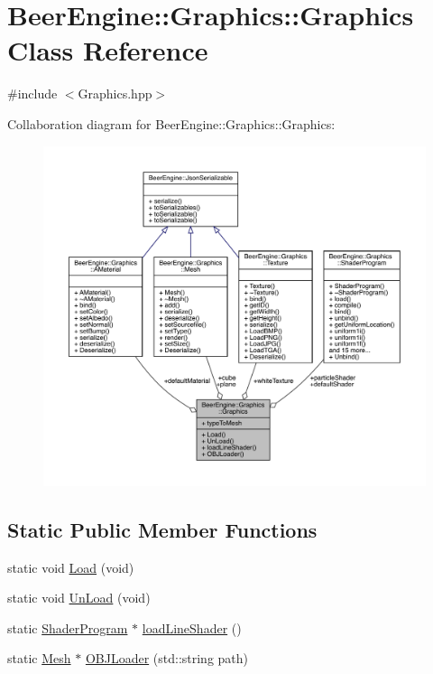 \hypertarget{class_beer_engine_1_1_graphics_1_1_graphics}{}\section{Beer\+Engine\+:\+:Graphics\+:\+:Graphics Class Reference}
\label{class_beer_engine_1_1_graphics_1_1_graphics}


{\ttfamily \#include $<$Graphics.\+hpp$>$}



Collaboration diagram for Beer\+Engine\+:\+:Graphics\+:\+:Graphics\+:\nopagebreak
\begin{figure}[H]
\begin{center}
\leavevmode
\includegraphics[width=350pt]{class_beer_engine_1_1_graphics_1_1_graphics__coll__graph}
\end{center}
\end{figure}
\subsection*{Static Public Member Functions}
\begin{DoxyCompactItemize}
\item 
static void \mbox{\hyperlink{class_beer_engine_1_1_graphics_1_1_graphics_a87ad2f3a98b4fa5fd453589f7f023701}{Load}} (void)
\item 
static void \mbox{\hyperlink{class_beer_engine_1_1_graphics_1_1_graphics_ab42d214b5a3f69614ad5b9c30d506619}{Un\+Load}} (void)
\item 
static \mbox{\hyperlink{class_beer_engine_1_1_graphics_1_1_shader_program}{Shader\+Program}} $\ast$ \mbox{\hyperlink{class_beer_engine_1_1_graphics_1_1_graphics_a385cbcbf514ef7c22cb4a0ed6f577908}{load\+Line\+Shader}} ()
\item 
static \mbox{\hyperlink{class_beer_engine_1_1_graphics_1_1_mesh}{Mesh}} $\ast$ \mbox{\hyperlink{class_beer_engine_1_1_graphics_1_1_graphics_a0b9081ae33ab8eb0a166c49f70d907ef}{O\+B\+J\+Loader}} (std\+::string path)
\end{DoxyCompactItemize}
